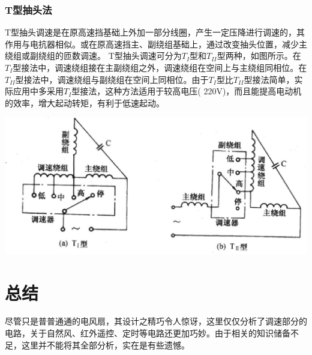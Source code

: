 \documentclass[a4paper,11pt]{ctexart}
\begin{document}
\subsubsection{T型抽头法}
T型抽头调速是在原高速挡基础上外加一部分线圈，产生一定压降进行调速的，其作用与电抗器相似。或在原高速挡主、副绕组基础上，通过改变抽头位置，减少主绕组或副绕组的匝数调速。
T型抽头调速可分为$T_I$型和$T_{II}$型两种，如图所示。在$T_I$型接法中，调速绕组接在主副绕组之外，调速绕组在空间上与主绕组同相位。在$T_{II}$型接法中，调速绕组与副绕组在空间上同相位。由于$T_I$型比$T_{II}$型接法简单，实际应用中多采用$T_I$型接法，这种方法适用于较高电压( 220V)，而且能提高电动机的效率，增大起动转矩，有利于低速起动。
\begin{center}
\includegraphics[width=0.8\linewidth]{./images/pic_4.eps}
\end{center}

\section{总结}
尽管只是普普通通的电风扇，其设计之精巧令人惊讶，这里仅仅分析了调速部分的电路，关于自然风、红外遥控、定时等电路还更加巧妙。由于相关的知识储备不足，这里并不能将其全部分析，实在是有些遗憾。

\end{document}
